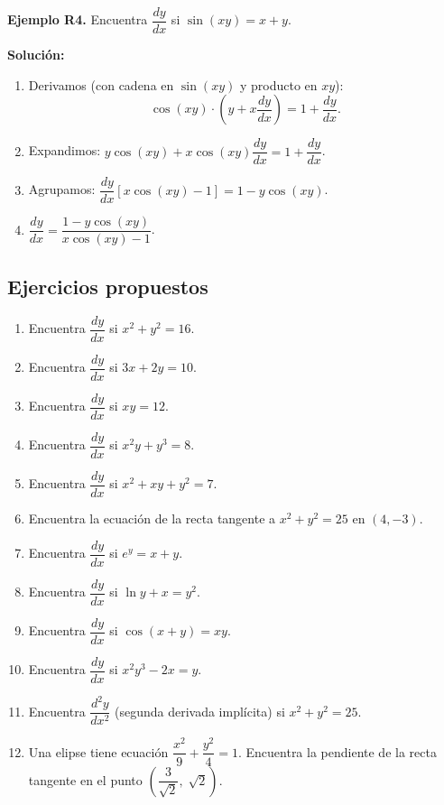 \documentclass[12pt, a4paper]{article}
\begin{document}
\textbf{Ejemplo R4.} Encuentra $\dfrac{dy}{dx}$ si $\sin(xy) = x + y$.

\begin{cuadrosolucion}
  \textbf{Solución:}
  \begin{enumerate}
    \item Derivamos (con cadena en $\sin(xy)$ y producto en $xy$):
          $$\cos(xy) \cdot \left(y + x\dfrac{dy}{dx}\right) = 1 + \dfrac{dy}{dx}.$$
    \item Expandimos: $y\cos(xy) + x\cos(xy)\dfrac{dy}{dx} = 1 + \dfrac{dy}{dx}$.
    \item Agrupamos: $\dfrac{dy}{dx}\left[x\cos(xy) - 1\right] = 1 - y\cos(xy)$.
    \item $\dfrac{dy}{dx} = \dfrac{1 - y\cos(xy)}{x\cos(xy) - 1}$.
  \end{enumerate}
\end{cuadrosolucion}

\newpage

\subsection{Ejercicios propuestos}

\begin{enumerate}[leftmargin=*, resume]
  \item \facil{} Encuentra $\dfrac{dy}{dx}$ si $x^2 + y^2 = 16$.
  \item \facil{} Encuentra $\dfrac{dy}{dx}$ si $3x + 2y = 10$.
  \item \facil{} Encuentra $\dfrac{dy}{dx}$ si $xy = 12$.
  \item \medio{} Encuentra $\dfrac{dy}{dx}$ si $x^2 y + y^3 = 8$.
  \item \medio{} Encuentra $\dfrac{dy}{dx}$ si $x^2 + xy + y^2 = 7$.
  \item \medio{} Encuentra la ecuación de la recta tangente a $x^2 + y^2 = 25$ en $(4, -3)$.
  \item \medio{} Encuentra $\dfrac{dy}{dx}$ si $e^y = x + y$.
  \item \medio{} Encuentra $\dfrac{dy}{dx}$ si $\ln y + x = y^2$.
  \item \dificil{} Encuentra $\dfrac{dy}{dx}$ si $\cos(x + y) = xy$.
  \item \dificil{} Encuentra $\dfrac{dy}{dx}$ si $x^2 y^3 - 2x = y$.
  \item \dificil{} Encuentra $\dfrac{d^2y}{dx^2}$ (segunda derivada implícita) si $x^2 + y^2 = 25$.
  \item \dificil{} Una elipse tiene ecuación $\dfrac{x^2}{9} + \dfrac{y^2}{4} = 1$. Encuentra la pendiente de la recta tangente en el punto $\left(\dfrac{3}{\sqrt{2}},\; \sqrt{2}\right)$.
\end{enumerate}
\end{document}
